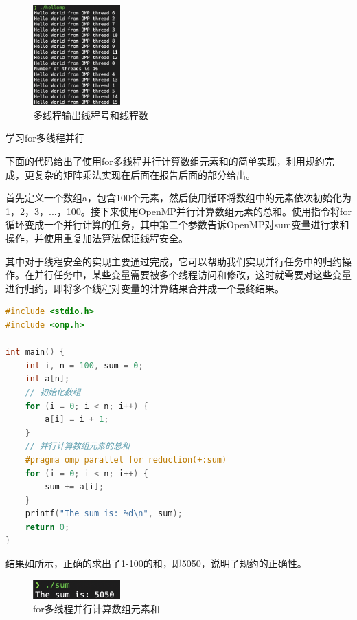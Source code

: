 \documentclass[lang=cn,a4paper,chinesefont=founder,bibend=bibtex]{shu-lab-report}
\begin{document}
\newpage

\begin{figure}
  \centering
  \includegraphics[width=0.3\textwidth]{image/1.jpg}
  \caption{多线程输出线程号和线程数}
  \label{fig:1}
\end{figure}


\begin{tcolorbox}[title=要求3]
  学习for多线程并行
\end{tcolorbox}

下面的代码给出了使用for多线程并行计算数组元素和的简单实现，利用规约完成，更复杂的矩阵乘法实现在后面在报告后面的部分给出。

首先定义一个数组a，包含100个元素，然后使用循环将数组中的元素依次初始化为1，2，3，...，100。接下来使用OpenMP并行计算数组元素的总和。使用指令将for循环变成一个并行计算的任务，其中第二个参数告诉OpenMP对sum变量进行求和操作，并使用重复加法算法保证线程安全。

其中对于线程安全的实现主要通过完成，它可以帮助我们实现并行任务中的归约操作。在并行任务中，某些变量需要被多个线程访问和修改，这时就需要对这些变量进行归约，即将多个线程对变量的计算结果合并成一个最终结果。

\begin{lstlisting}[language=c]
#include <stdio.h>
#include <omp.h>

int main() {
    int i, n = 100, sum = 0;
    int a[n];
    // 初始化数组
    for (i = 0; i < n; i++) {
        a[i] = i + 1;
    }
    // 并行计算数组元素的总和
    #pragma omp parallel for reduction(+:sum)
    for (i = 0; i < n; i++) {
        sum += a[i];
    }
    printf("The sum is: %d\n", sum);
    return 0;
}
\end{lstlisting}

结果如所示，正确的求出了1-100的和，即5050，说明了规约的正确性。

\begin{figure}
  \centering
  \includegraphics[width=0.3\textwidth]{image/4.jpg}
  \caption{for多线程并行计算数组元素和}
  \label{fig:4}
\end{figure}
\end{document}
